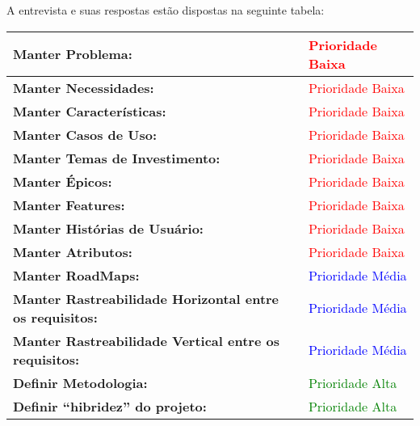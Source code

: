A entrevista e suas respostas estão dispostas na seguinte tabela:

\begin{table}[H]
\centering
\begin{tabular}{|p{7cm}|p{3cm}|}
\hline
\textbf{Manter Problema:} &
\textcolor{red}{Prioridade Baixa}
\\ \hline
\textbf{Manter Necessidades:} &
\textcolor{red}{Prioridade Baixa}
\\ \hline
\textbf{Manter Características:} &
\textcolor{red}{Prioridade Baixa}
\\ \hline
\textbf{Manter Casos de Uso:} &
\textcolor{red}{Prioridade Baixa}
\\ \hline
\textbf{Manter Temas de Investimento:} &
\textcolor{red}{Prioridade Baixa}
\\ \hline
\textbf{Manter Épicos:} &
\textcolor{red}{Prioridade Baixa}
\\ \hline
\textbf{Manter Features:} &
\textcolor{red}{Prioridade Baixa}
\\ \hline
\textbf{Manter Histórias de Usuário:} &
\textcolor{red}{Prioridade Baixa}
\\ \hline
\textbf{Manter Atributos:} &
\textcolor{red}{Prioridade Baixa}
\\ \hline
\textbf{Manter RoadMaps:} &
\textcolor{blue}{Prioridade Média}
\\ \hline
\textbf{Manter Rastreabilidade Horizontal entre os requisitos:} &
\textcolor{blue}{Prioridade Média}
\\ \hline
\textbf{Manter Rastreabilidade Vertical entre os requisitos:} &
\textcolor{blue}{Prioridade Média}
\\ \hline
\textbf{Definir Metodologia:} &
\textcolor{green}{Prioridade Alta}
\\ \hline
\textbf{Definir “hibridez” do projeto:} &
\textcolor{green}{Prioridade Alta}
\\ \hline

\end{tabular}
\end{table}
